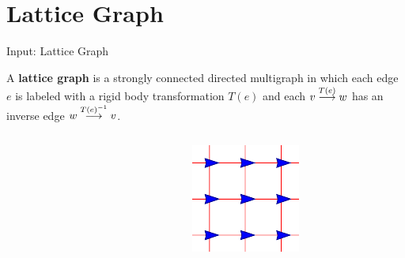 \section{Lattice Graph}
\begin{frame}{Input: Lattice Graph}
  \begin{definition}
    A \textbf{lattice graph} is a strongly connected directed
      multigraph in which each edge $e$ is labeled with a rigid body
      transformation $T(e)$ and each ${v}\overset{T(e)}{\longrightarrow}{w}$ has an
      inverse edge ${w}\overset{T(e)^{-1}}{\longrightarrow}{v}$.  
    \end{definition}
    \begin{columns}[T] %
      \begin{column}{.45\textwidth}
        \begin{figure}
          \centering
        \end{figure}
      \end{column}%
      \begin{column}{.45\textwidth}
        \begin{figure}
          \centering
          \includegraphics[scale=1]{figs/squarelattice}
        \end{figure}
      \end{column}%
    \end{columns}
\end{frame}


